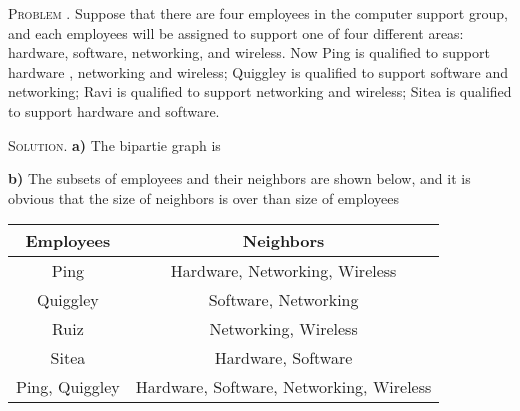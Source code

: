 \documentclass[12pt, a4paper, oneside]{article}
\newcounter{problemname}
\newenvironment{problem}{\stepcounter{problemname}\par\noindent\textsc{Problem \arabic{problemname}. }}{\\\par}
\newenvironment{solution}{\par\noindent\textsc{Solution. }}{\\\par}
\begin{document}
\begin{problem}
    Suppose that there are four employees in the computer support group, and each employees will be assigned to support
    one of four different areas: hardware, software, networking, and wireless. Now Ping is qualified to support hardware
    , networking and wireless; Quiggley is qualified to support software and networking; Ravi is qualified to support networking
    and wireless; Sitea is qualified to support hardware and software.
\end{problem}

\begin{solution}
    \textbf{a)} The bipartie graph is
    \begin{figure*}[!htbp]
        \centering
    \end{figure*}
    \newline\textbf{b)} The subsets of employees and their neighbors are shown below,
    and it is obvious that the size of neighbors is over than size of employees\newline
    \begin{table}[!htbp]
        \centering
        \begin{tabular}{cc}
            \toprule
            Employees & Neighbors \\\midrule
            Ping & Hardware, Networking, Wireless \\
            Quiggley & Software, Networking \\
            Ruiz & Networking, Wireless \\
            Sitea & Hardware, Software \\
            Ping, Quiggley & Hardware, Software, Networking, Wireless \\

\end{tabular}
\end{table}
\end{solution}
\end{document}

